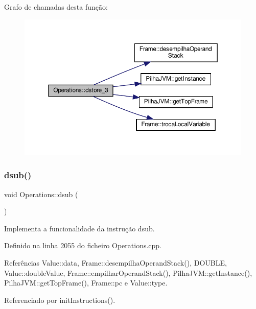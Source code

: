 Grafo de chamadas desta função\+:\nopagebreak
\begin{figure}[H]
\begin{center}
\leavevmode
\includegraphics[width=350pt]{classOperations_a161cba32105238617b0cfd5c47afdfe4_cgraph}
\end{center}
\end{figure}
\mbox{\label{classOperations_aa994b0cf4aead2646fa5bb90c2643664}} 
\subsubsection{\texorpdfstring{dsub()}{dsub()}}
{\footnotesize\ttfamily void Operations\+::dsub (\begin{DoxyParamCaption}{ }\end{DoxyParamCaption})\hspace{0.3cm}{\ttfamily [private]}}



Implementa a funcionalidade da instrução dsub. 



Definido na linha 2055 do ficheiro Operations.\+cpp.



Referências Value\+::data, Frame\+::desempilha\+Operand\+Stack(), D\+O\+U\+B\+LE, Value\+::double\+Value, Frame\+::empilhar\+Operand\+Stack(), Pilha\+J\+V\+M\+::get\+Instance(), Pilha\+J\+V\+M\+::get\+Top\+Frame(), Frame\+::pc e Value\+::type.



Referenciado por init\+Instructions().

